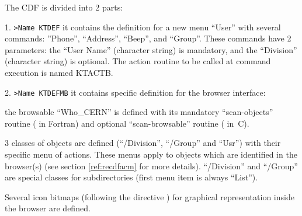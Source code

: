 The CDF{} is divided into 2 parts:
\begin{UL}
\item[1.] {\tt >Name KTDEF} \hfill\break
it contains the definition for a new menu ``User'' with several
commands: ''Phone'', ``Address'', ``Beep'', and ``Group''. These
commands have 2 parameters: the ``User Name'' (character string) is
mandatory, and the ``Division'' (character string) is optional.
\hfill\break
The action routine to be called at command execution is named KTACTB.
\item[2.] {\tt >Name KTDEFMB} \hfill\break
it contains specific definition for the \KUIPMotif{} browser interface:
\begin{UL}
\item the browsable ``Who\_CERN'' is defined with its mandatory 
``scan-objects'' routine ( in Fortran) and optional 
``scan-browsable'' routine ( in~C).
\item 3 classes of objects are defined (``/Division'', ``/Group'' and
``Usr'') with their specific menu of actions.  These menus apply to objects 
which are identified in the \KUIP{} browser(s) (see  section
\ref{ref:recdfacm} for more details). ``/Division'' and ``/Group'' are
special classes for subdirectories (first menu item is always ``List'').
\item Several icon bitmaps (following the directive )
for graphical representation inside the browser are defined.
\end{UL}
\end{UL}


